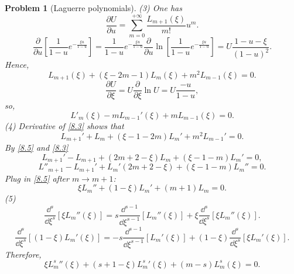 \documentclass{article}
\theoremstyle{1}
\newtheorem{problem}{Problem}
\newcommand{\pa}{\partial}
\begin{document}
\begin{problem}[Laguerre polynomials]
    (3) One has 
    \begin{equation}
        \frac{\pa U}{\pa u}=\sum_{m=0}^{+\infty}\frac{L_{m+1}(\xi)}{m!}u ^m.
    \end{equation}
    \begin{equation}
        \frac{\pa}{\pa u}\left[\frac{1}{1-u}e^{-\frac{\xi u}{1-u}}\right]=\frac{1}{1-u}e^{-\frac{\xi u}{1-u}}\frac{\pa}{\pa u}\ln\left[\frac{1}{1-u}e^{-\frac{\xi u}{1-u}}\right]=U\frac{1-u-\xi}{(1-u)^2}.
    \end{equation}
    Hence,
    \begin{equation}\label{8.3}
        L_{m+1}(\xi)+\left(\xi-2m-1\right)L_m(\xi)+m^2L_{m-1}(\xi)=0.
    \end{equation}
    \begin{equation}
        \frac{\pa U}{\pa \xi}=U\frac{\pa}{\pa \xi}\ln U=U\frac{-u}{1-u},
    \end{equation}
    so,
    \begin{equation}\label{8.5}
        L'_m(\xi)-mL_{m-1}'(\xi)+mL_{m-1}(\xi)=0.
    \end{equation}
    (4) Derivative of \eqref{8.3} shows that 
    \begin{equation}
        L_{m+1}'+L_m+(\xi -1-2m)L_m'+m^2L_{m-1}'=0.
    \end{equation}
    By \eqref{8.5} and \eqref{8.3}
    \begin{equation}
        L_{m+1}'-L_{m+1}+(2m+2-\xi)L_m+(\xi -1-m)L_m'=0,
    \end{equation}
    \begin{equation}
        L''_{m+1}-L_{m+1}'+L_m'(2m+2-\xi)+(\xi-1-m)L_m''=0.
    \end{equation}
    Plug in \eqref{8.5} after $m\rightarrow m+1$:
    \begin{equation}
        \xi L_m''+(1-\xi)L_m'+(m+1)L_m=0.
    \end{equation}
    (5) 
    \begin{equation}
        \frac{\dd^s}{\dd{\xi}^s}\left[\xi L_m''(\xi)\right]=s\frac{\dd^{s-1}}{\dd{\xi}^{s-1}}\left[L_m''(\xi)\right]+\xi\frac{\dd^s}{\dd{\xi}^s}\left[\xi L_m''(\xi)\right].
    \end{equation}
    \begin{equation}
        \frac{\dd^s}{\dd{\xi}^s}\left[(1-\xi) L_m'(\xi)\right]=-s\frac{\dd^{s-1}}{\dd{\xi}^{s-1}}\left[L_m'(\xi)\right]+(1-\xi)\frac{\dd^s}{\dd{\xi}^s}\left[\xi L_m'(\xi)\right].
    \end{equation}
    Therefore,
    \begin{equation}
        \xi {L_m^s}''(\xi)+\left(s+1-\xi\right){L_m^s}'(\xi)+\left(m-s\right) L_m^s(\xi)=0.
    \end{equation}



\end{problem}
\end{document}
